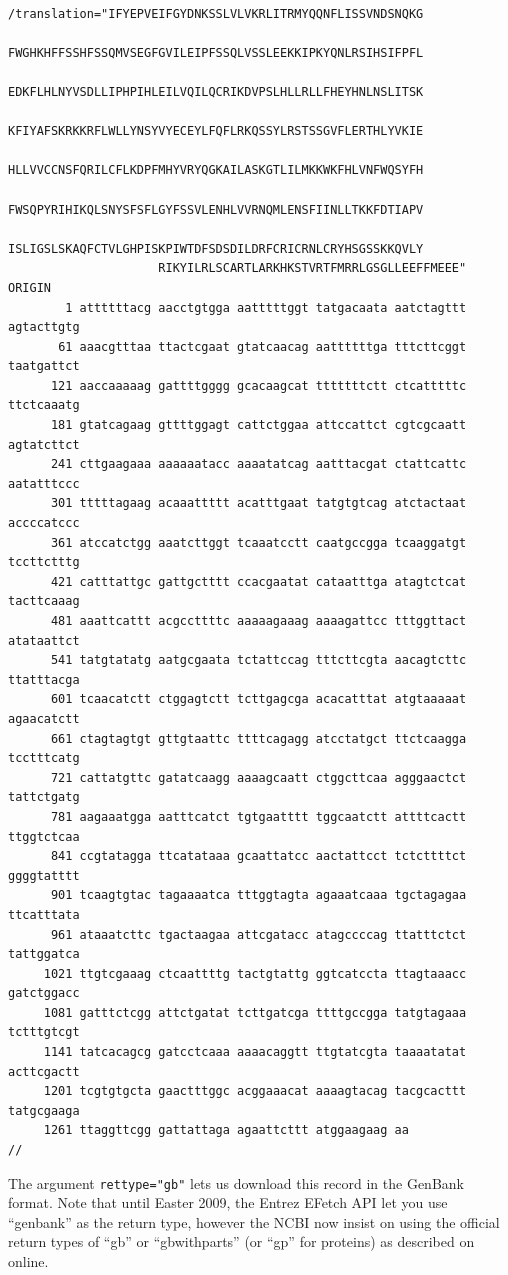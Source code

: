 \documentclass{report}
\begin{document}
\begin{verbatim}
                     /translation="IFYEPVEIFGYDNKSSLVLVKRLITRMYQQNFLISSVNDSNQKG
                     FWGHKHFFSSHFSSQMVSEGFGVILEIPFSSQLVSSLEEKKIPKYQNLRSIHSIFPFL
                     EDKFLHLNYVSDLLIPHPIHLEILVQILQCRIKDVPSLHLLRLLFHEYHNLNSLITSK
                     KFIYAFSKRKKRFLWLLYNSYVYECEYLFQFLRKQSSYLRSTSSGVFLERTHLYVKIE
                     HLLVVCCNSFQRILCFLKDPFMHYVRYQGKAILASKGTLILMKKWKFHLVNFWQSYFH
                     FWSQPYRIHIKQLSNYSFSFLGYFSSVLENHLVVRNQMLENSFIINLLTKKFDTIAPV
                     ISLIGSLSKAQFCTVLGHPISKPIWTDFSDSDILDRFCRICRNLCRYHSGSSKKQVLY
                     RIKYILRLSCARTLARKHKSTVRTFMRRLGSGLLEEFFMEEE"
ORIGIN      
        1 attttttacg aacctgtgga aatttttggt tatgacaata aatctagttt agtacttgtg
       61 aaacgtttaa ttactcgaat gtatcaacag aattttttga tttcttcggt taatgattct
      121 aaccaaaaag gattttgggg gcacaagcat tttttttctt ctcatttttc ttctcaaatg
      181 gtatcagaag gttttggagt cattctggaa attccattct cgtcgcaatt agtatcttct
      241 cttgaagaaa aaaaaatacc aaaatatcag aatttacgat ctattcattc aatatttccc
      301 tttttagaag acaaattttt acatttgaat tatgtgtcag atctactaat accccatccc
      361 atccatctgg aaatcttggt tcaaatcctt caatgccgga tcaaggatgt tccttctttg
      421 catttattgc gattgctttt ccacgaatat cataatttga atagtctcat tacttcaaag
      481 aaattcattt acgccttttc aaaaagaaag aaaagattcc tttggttact atataattct
      541 tatgtatatg aatgcgaata tctattccag tttcttcgta aacagtcttc ttatttacga
      601 tcaacatctt ctggagtctt tcttgagcga acacatttat atgtaaaaat agaacatctt
      661 ctagtagtgt gttgtaattc ttttcagagg atcctatgct ttctcaagga tcctttcatg
      721 cattatgttc gatatcaagg aaaagcaatt ctggcttcaa agggaactct tattctgatg
      781 aagaaatgga aatttcatct tgtgaatttt tggcaatctt attttcactt ttggtctcaa
      841 ccgtatagga ttcatataaa gcaattatcc aactattcct tctcttttct ggggtatttt
      901 tcaagtgtac tagaaaatca tttggtagta agaaatcaaa tgctagagaa ttcatttata
      961 ataaatcttc tgactaagaa attcgatacc atagccccag ttatttctct tattggatca
     1021 ttgtcgaaag ctcaattttg tactgtattg ggtcatccta ttagtaaacc gatctggacc
     1081 gatttctcgg attctgatat tcttgatcga ttttgccgga tatgtagaaa tctttgtcgt
     1141 tatcacagcg gatcctcaaa aaaacaggtt ttgtatcgta taaaatatat acttcgactt
     1201 tcgtgtgcta gaactttggc acggaaacat aaaagtacag tacgcacttt tatgcgaaga
     1261 ttaggttcgg gattattaga agaattcttt atggaagaag aa
//
\end{verbatim}

The argument \verb+rettype="gb"+ lets us download this record in the GenBank format.
Note that until Easter 2009, the Entrez EFetch API let you use ``genbank'' as the
return type, however the NCBI now insist on using the official return types of
``gb'' or ``gbwithparts'' (or ``gp'' for proteins) as described on online.
\end{document}
